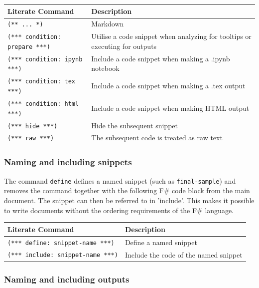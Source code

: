 \documentclass{article}
\begin{document}
\begin{tabular}{|l|l|}\hline
\textbf{Literate Command} & \textbf{Description}\\ \hline\hline
\texttt{(** ... *)} & Markdown\\ \hline
\texttt{(*** condition: prepare ***)} & Utilise a code snippet when analyzing for tooltips or executing for outputs\\ \hline
\texttt{(*** condition: ipynb ***)} & Include a code snippet when making a .ipynb notebook\\ \hline
\texttt{(*** condition: tex ***)} & Include a code snippet when making a .tex output\\ \hline
\texttt{(*** condition: html ***)} & Include a code snippet when making HTML output\\ \hline
\texttt{(*** hide ***)} & Hide the subsequent snippet\\ \hline
\texttt{(*** raw ***)} & The subsequent code is treated as raw text\\ \hline
\end{tabular}

\subsubsection*{Naming and including snippets}



The command \texttt{define} defines a named snippet (such as \texttt{final-sample}) and removes the command together with
the following F\# code block from the main document. The snippet can then
be referred to in 'include'. This makes it
possible to write documents without the ordering requirements of the
F\# language.
\begin{tabular}{|l|l|}\hline
\textbf{Literate Command} & \textbf{Description}\\ \hline\hline
\texttt{(*** define: snippet-name ***)} & Define a named snippet\\ \hline
\texttt{(*** include: snippet-name ***)} & Include the code of the named snippet\\ \hline
\end{tabular}

\subsubsection*{Naming and including outputs}
\end{document}
